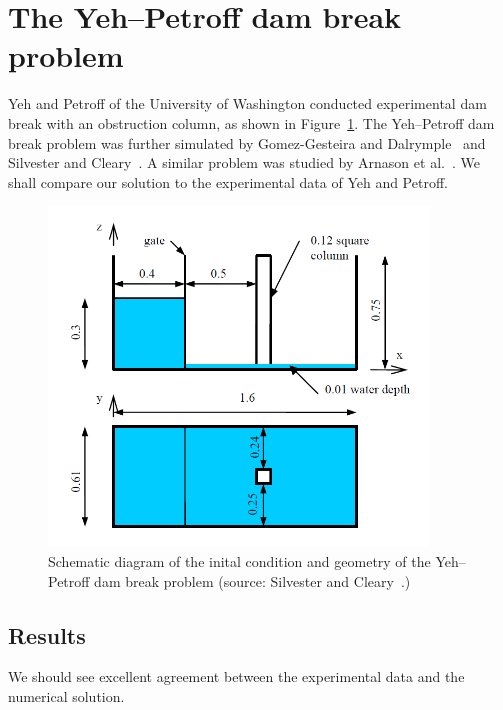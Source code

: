 
\section{The Yeh--Petroff dam break problem}
Yeh and Petroff of the University of Washington conducted experimental dam break with an obstruction column, as shown in Figure~\ref{fig:YP}.
The Yeh--Petroff dam break problem was further simulated by Gomez-Gesteira and Dalrymple~\cite{GD2004} and Silvester and Cleary~\cite{SC2006}. A similar problem was studied by Arnason et al.~\cite{APY2009}.
We shall compare our \anuga{} solution to the experimental data of Yeh and Petroff.

\begin{figure}
\begin{center}
\includegraphics[width=0.9\textwidth]{Yeh_Petroff.png}
\end{center}
\caption{Schematic diagram of the inital condition and geometry of the Yeh--Petroff dam break problem (source: Silvester and Cleary~\cite{SC2006}.)} \label{fig:YP}
\end{figure}




\subsection{Results}

We should see excellent agreement between the experimental data and the numerical solution. 

